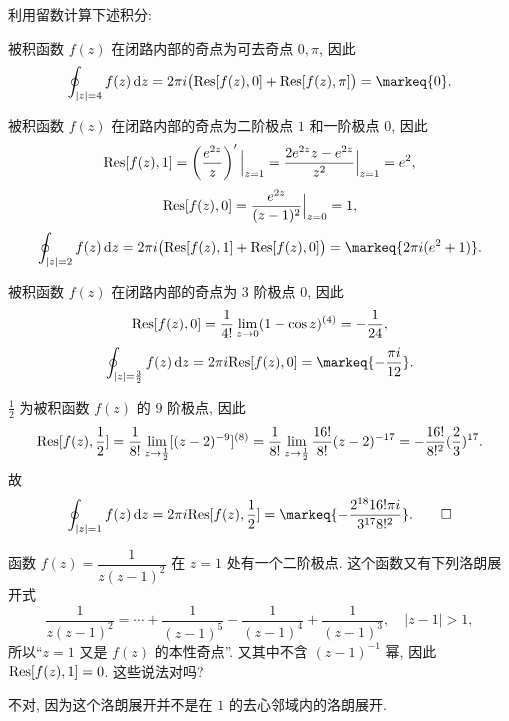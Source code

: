 \begin{exercise}[2]{9}
	利用留数计算下述积分:
\end{exercise}
\begin{solution}
	\subex 被积函数 $f(z)$ 在闭路内部的奇点为可去奇点 $0,\pi$, 因此
	\[\oint_{|z|=4}f(z)\diff z=2\pi i\bigl(\Res[f(z),0]+\Res[f(z),\pi]\bigr)=\markeq{0}.\]

	\subex 被积函数 $f(z)$ 在闭路内部的奇点为二阶极点 $1$ 和一阶极点 $0$, 因此
	\[{\mathrm{Res}}[f(z),1]=\left(\frac{e^{2z}}{z}\right)'\Big|_{z=1}=\frac{2e^{2z}z-e^{2z}}{z^2}\Big|_{z=1}=e^2,\]
	\[{\mathrm{Res}}[f(z),0]=\frac{e^{2z}}{(z-1)^2}\Big|_{z=0}=1,\]
	\[\oint_{|z|=2}f(z)\diff z=2\pi i\bigl(\Res[f(z),1]+\Res[f(z),0]\bigr)=\markeq{2\pi i(e^2+1)}.\]

	\subex 被积函数 $f(z)$ 在闭路内部的奇点为 $3$ 阶极点 $0$, 因此
	\[{\mathrm{Res}}[f(z),0]=\frac1{4!}\lim_{z\to 0}(1-\cos z)^{(4)}=-\frac1{24},\]
	\[\oint_{|z|=\frac32}f(z)\diff z=2\pi i\Res[f(z),0]=\markeq{-\frac{\pi i}{12}}.\]

	\subex $\frac12$ 为被积函数 $f(z)$ 的 $9$ 阶极点, 因此
	\[{\mathrm{Res}}[f(z),\frac12]
		=\frac1{8!}\lim_{z\to \frac12}[(z-2)^{-9}]^{(8)}
		=\frac1{8!}\lim_{z\to \frac12}\frac{16!}{8!}(z-2)^{-17}
		=-\frac{16!}{8!^2}(\frac23)^{17}.\]
	故
	\[\oint_{|z|=1}f(z)\diff z=2\pi i\Res[f(z),\frac12]=\markeq{-\frac{2^{18}16!\pi i}{{3^{17}}8!^2}}.\qedhere\]
\end{solution}


\begin{exercise}
	函数 $f(z)=\dfrac1{z(z-1)^2}$ 在 $z=1$ 处有一个二阶极点. 这个函数又有下列洛朗展开式
	\[\frac1{z(z-1)^2}=\cdots+\frac1{(z-1)^5}-\frac1{(z-1)^4}+\frac1{(z-1)^3},\quad|z-1|>1,\]
	所以``$z=1$ 又是 $f(z)$ 的本性奇点''. 又其中不含 $(z-1)^{-1}$ 幂, 因此 ${\mathrm{Res}}[f(z),1]=0$. 这些说法对吗?
	\end{exercise}
	\begin{solution}
	不对, 因为这个洛朗展开并不是在 $1$ 的去心邻域内的洛朗展开.
	\end{solution}
		


